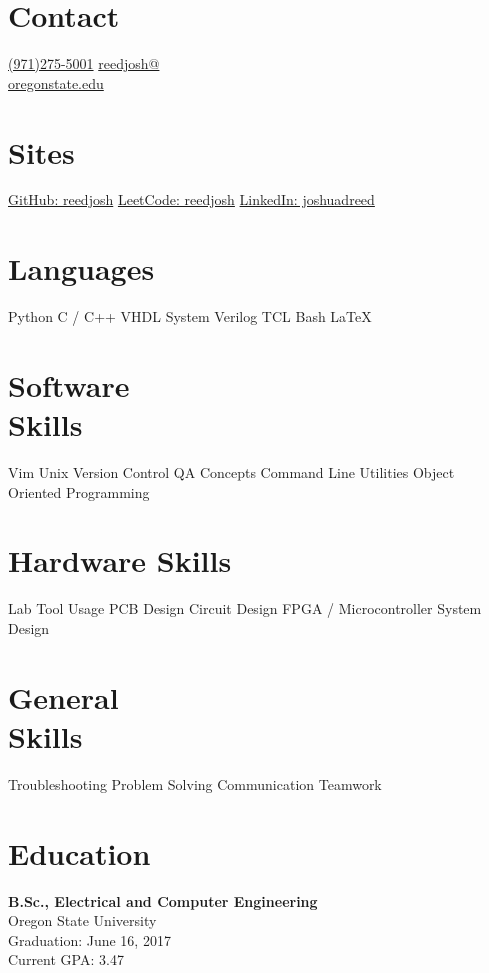 \documentclass[]{friggeri-cv}
\begin{document}
       {}


\begin{aside}
  \section{Contact}
    \href{tel:19712755001}{(971)275-5001}
    \href{mailto:reedjosh@oregonstate.edu}{reedjosh@\\oregonstate.edu}
  \section{Sites}
    \href{https://github.com/reedjosh}{GitHub: reedjosh}
    \href{https://leetcode.com/reedjosh/}{LeetCode: reedjosh}
    \href{https://www.linkedin.com/in/joshuadreed}{LinkedIn: joshuadreed}
  \section{Languages}
    Python 
    C / C++
    VHDL
    System Verilog
    TCL
    Bash
    \LaTeX
  \section{Software \\Skills}
    Vim
    Unix
    Version Control
    QA Concepts
    Command Line Utilities
    Object Oriented Programming
  \section{Hardware Skills}
    Lab Tool Usage
    PCB Design
    Circuit Design
    FPGA / Microcontroller System Design
  \section{General \\ Skills}
     Troubleshooting 
     Problem Solving
     Communication
     Teamwork
\end{aside}



\section{Education}
\vspace{-2mm}

    \textbf{B.Sc., Electrical and Computer Engineering} \\
    Oregon State University \\
    Graduation: June 16, 2017 \\
    Current GPA: 3.47
\end{document}
